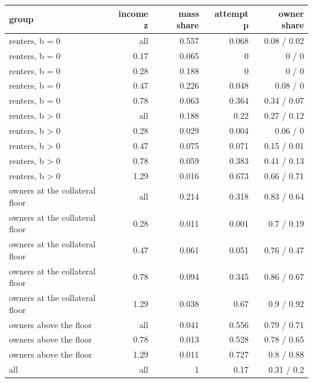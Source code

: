 \begin{tabular}{lrrrr}
\toprule
group & income z & mass share & attempt p & owner share \\
\midrule
renters, b = 0 & all & 0.557 & 0.068 & 0.08 / 0.02 \\
renters, b = 0 & 0.17 & 0.065 & 0 & 0 / 0 \\
renters, b = 0 & 0.28 & 0.188 & 0 & 0 / 0 \\
renters, b = 0 & 0.47 & 0.226 & 0.048 & 0.08 / 0 \\
renters, b = 0 & 0.78 & 0.063 & 0.364 & 0.34 / 0.07 \\
renters, b > 0 & all & 0.188 & 0.22 & 0.27 / 0.12 \\
renters, b > 0 & 0.28 & 0.029 & 0.004 & 0.06 / 0 \\
renters, b > 0 & 0.47 & 0.075 & 0.071 & 0.15 / 0.01 \\
renters, b > 0 & 0.78 & 0.059 & 0.383 & 0.41 / 0.13 \\
renters, b > 0 & 1.29 & 0.016 & 0.673 & 0.66 / 0.71 \\
owners at the collateral floor & all & 0.214 & 0.318 & 0.83 / 0.64 \\
owners at the collateral floor & 0.28 & 0.011 & 0.001 & 0.7 / 0.19 \\
owners at the collateral floor & 0.47 & 0.061 & 0.051 & 0.76 / 0.47 \\
owners at the collateral floor & 0.78 & 0.094 & 0.345 & 0.86 / 0.67 \\
owners at the collateral floor & 1.29 & 0.038 & 0.67 & 0.9 / 0.92 \\
owners above the floor & all & 0.041 & 0.556 & 0.79 / 0.71 \\
owners above the floor & 0.78 & 0.013 & 0.528 & 0.78 / 0.65 \\
owners above the floor & 1.29 & 0.011 & 0.727 & 0.8 / 0.88 \\
all & all & 1 & 0.17 & 0.31 / 0.2 \\
\bottomrule
\end{tabular}
